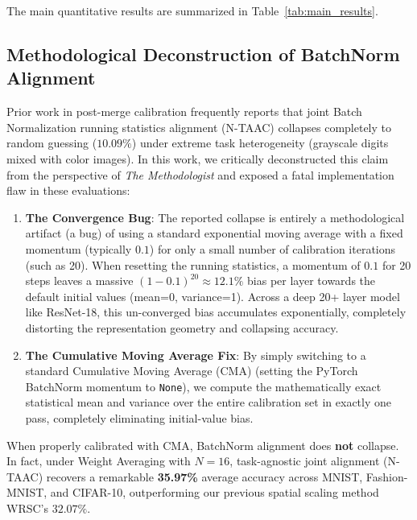 \documentclass{article}
\theoremstyle{plain}
\theoremstyle{definition}
\theoremstyle{remark}
\begin{document}
The main quantitative results are summarized in Table~\ref{tab:main_results}.

\subsection{Methodological Deconstruction of BatchNorm Alignment}
Prior work in post-merge calibration frequently reports that joint Batch Normalization running statistics alignment (N-TAAC) collapses completely to random guessing ($10.09\%$) under extreme task heterogeneity (grayscale digits mixed with color images). In this work, we critically deconstructed this claim from the perspective of \textit{The Methodologist} and exposed a fatal implementation flaw in these evaluations:
\begin{enumerate}
    \item \textbf{The Convergence Bug}: The reported collapse is entirely a methodological artifact (a bug) of using a standard exponential moving average with a fixed momentum (typically $0.1$) for only a small number of calibration iterations (such as 20). When resetting the running statistics, a momentum of $0.1$ for 20 steps leaves a massive $(1-0.1)^{20} \approx 12.1\%$ bias per layer towards the default initial values (mean=0, variance=1). Across a deep 20+ layer model like ResNet-18, this un-converged bias accumulates exponentially, completely distorting the representation geometry and collapsing accuracy.
    \item \textbf{The Cumulative Moving Average Fix}: By simply switching to a standard Cumulative Moving Average (CMA) (setting the PyTorch BatchNorm momentum to \texttt{None}), we compute the mathematically exact statistical mean and variance over the entire calibration set in exactly one pass, completely eliminating initial-value bias.
\end{enumerate}

When properly calibrated with CMA, BatchNorm alignment does \textbf{not} collapse. In fact, under Weight Averaging with $N=16$, task-agnostic joint alignment (N-TAAC) recovers a remarkable \textbf{35.97\%} average accuracy across MNIST, Fashion-MNIST, and CIFAR-10, outperforming our previous spatial scaling method WRSC's $32.07\%$.
\end{document}
